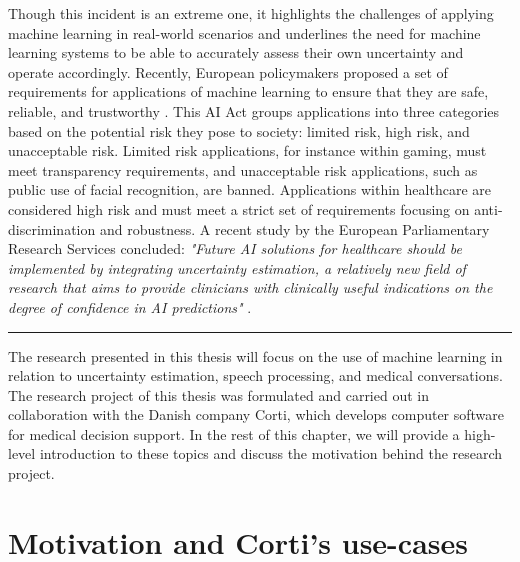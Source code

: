 Though this incident is an extreme one, it highlights the challenges of applying machine learning in real-world scenarios and underlines the need for machine learning systems to be able to accurately assess their own uncertainty and operate accordingly. 
Recently, European policymakers proposed a set of requirements for applications of machine learning to ensure that they are safe, reliable, and trustworthy \cite{europeancommission_briefing_2021}. This AI Act groups applications into three categories based on the potential risk they pose to society: limited risk, high risk, and unacceptable risk. Limited risk applications, for instance within gaming, must meet transparency requirements, and unacceptable risk applications, such as public use of facial recognition, are banned. Applications within healthcare are considered high risk and must meet a strict set of requirements focusing on anti-discrimination and robustness. A recent study by the European Parliamentary Research Services concluded: \textit{"Future AI solutions for healthcare should be implemented by integrating uncertainty estimation, a relatively new field of research that aims to provide clinicians with clinically useful indications on the degree of confidence in AI predictions"} \cite{europeanparliament_artificial_2022}. 


\vspace{1em}
\begin{center}
\noindent\rule{0.2\textwidth}{0.5pt}
\end{center}
\vspace{1em}

\noindent The research presented in this thesis will focus on the use of machine learning in relation to uncertainty estimation, speech processing, and medical conversations. 
The research project of this thesis was formulated and carried out in collaboration with the Danish company Corti, which develops computer software for medical decision support. 
In the rest of this chapter, we will provide a high-level introduction to these topics and discuss the motivation behind the research project.


\section{Motivation and Corti's use-cases}

